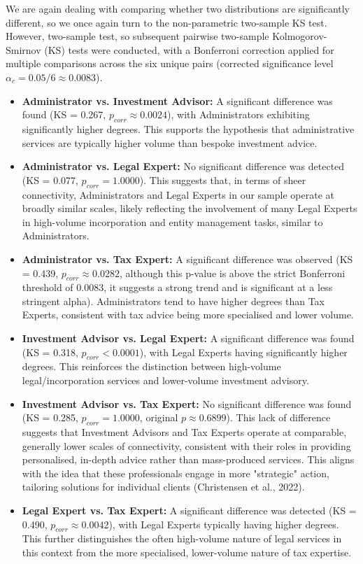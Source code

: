 We are again dealing with comparing whether two distributions are significantly different, so we once again turn to the non-parametric two-sample KS test. However, two-sample test, so subsequent pairwise two-sample Kolmogorov-Smirnov (KS) tests were conducted, with a Bonferroni correction applied for multiple comparisons across the six unique pairs (corrected significance level $\alpha_c = 0.05/6 \approx 0.0083$).  

\begin{itemize}
    \item \textbf{Administrator vs. Investment Advisor:} A significant difference was found (KS = 0.267, $p_{corr} \approx 0.0024$), with Administrators exhibiting significantly higher degrees. This supports the hypothesis that administrative services are typically higher volume than bespoke investment advice.
    \item \textbf{Administrator vs. Legal Expert:} No significant difference was detected (KS = 0.077, $p_{corr} = 1.0000$). This suggests that, in terms of sheer connectivity, Administrators and Legal Experts in our sample operate at broadly similar scales, likely reflecting the involvement of many Legal Experts in high-volume incorporation and entity management tasks, similar to Administrators.
    \item \textbf{Administrator vs. Tax Expert:} A significant difference was observed (KS = 0.439, $p_{corr} \approx 0.0282$, although this p-value is above the strict Bonferroni threshold of 0.0083, it suggests a strong trend and is significant at a less stringent alpha). Administrators tend to have higher degrees than Tax Experts, consistent with tax advice being more specialised and lower volume.
    \item \textbf{Investment Advisor vs. Legal Expert:} A significant difference was found (KS = 0.318, $p_{corr} < 0.0001$), with Legal Experts having significantly higher degrees. This reinforces the distinction between high-volume legal/incorporation services and lower-volume investment advisory.
    \item \textbf{Investment Advisor vs. Tax Expert:} No significant difference was found (KS = 0.285, $p_{corr} = 1.0000$, original $p \approx 0.6899$). This lack of difference suggests that Investment Advisors and Tax Experts operate at comparable, generally lower scales of connectivity, consistent with their roles in providing personalised, in-depth advice rather than mass-produced services. This aligns with the idea that these professionals engage in more "strategic" action, tailoring solutions for individual clients (Christensen et al., 2022).
    \item \textbf{Legal Expert vs. Tax Expert:} A significant difference was detected (KS = 0.490, $p_{corr} \approx 0.0042$), with Legal Experts typically having higher degrees. This further distinguishes the often high-volume nature of legal services in this context from the more specialised, lower-volume nature of tax expertise.
\end{itemize}

